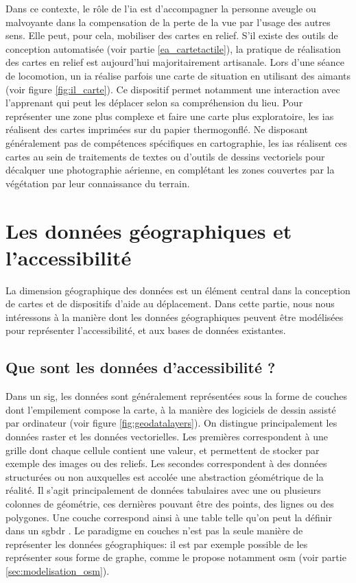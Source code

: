 Dans ce contexte, le rôle de l'\gls{ia} est d'accompagner la personne aveugle ou malvoyante dans la compensation de la perte de la vue par l'usage des autres sens. Elle peut, pour cela, mobiliser des cartes en relief. S'il existe des outils de conception automatisée (voir partie \ref{ea_cartetactile}), la pratique de réalisation des cartes en relief est aujourd'hui majoritairement artisanale. Lors d'une séance de locomotion, un \gls{ia} réalise parfois une carte de situation en utilisant des aimants (voir figure \ref{fig:il_carte}). Ce dispositif permet notamment une interaction avec l'apprenant qui peut les déplacer selon sa compréhension du lieu. Pour représenter une zone plus complexe et faire une carte plus exploratoire, les \glspl{ia} réalisent des cartes imprimées sur du papier thermogonflé. Ne disposant généralement pas de compétences spécifiques en cartographie, les \glspl{ia} réalisent ces cartes au sein de traitements de textes ou d'outils de dessins vectoriels pour décalquer une photographie aérienne, en complétant les zones couvertes par la végétation par leur connaissance du terrain. 

\section{Les données géographiques et l'accessibilité}

La dimension géographique des données est un élément central dans la conception de cartes et de dispositifs d'aide au déplacement. Dans cette partie, nous nous intéressons à la manière dont les données géographiques peuvent être modélisées pour représenter l'accessibilité, et aux bases de données existantes. 

\subsection{Que sont les données d'accessibilité ?}


Dans un \gls{sig}, les données sont généralement représentées sous la forme de couches dont l'empilement compose la carte, à la manière des logiciels de dessin assisté par ordinateur (voir figure \ref{fig:geodatalayers}). On distingue principalement les données raster et les données vectorielles. Les premières correspondent à une grille dont chaque cellule contient une valeur, et permettent de stocker par exemple des images ou des reliefs. Les secondes correspondent à des données structurées ou non auxquelles est accolée une abstraction géométrique de la réalité. Il s'agit principalement de données tabulaires avec une ou plusieurs colonnes de géométrie, ces dernières pouvant être des points, des lignes ou des polygones. Une couche correspond ainsi à une table telle qu'on peut la définir dans un \gls{sgbdr} \citep{AschanLeygonie2019}. Le paradigme en couches n'est pas la seule manière de représenter les données géographiques: il est par exemple possible de les représenter sous forme de graphe, comme le propose notamment \gls{osm} (voir partie \ref{sec:modelisation_osm}).

